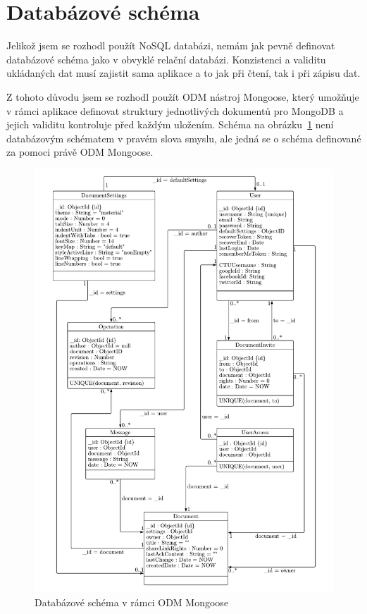 
\section{Databázové schéma}\label{sec:databázovéSchéma}

Jelikož jsem se rozhodl použít \gls{NoSQL} databázi, nemám jak pevně definovat databázové schéma jako v obvyklé relační databázi.
Konzistenci a validitu ukládaných dat musí zajistit sama aplikace a to jak při čtení, tak i při zápisu dat.

Z tohoto důvodu jsem se rozhodl použít \gls{ODM} nástroj Mongoose, který umožňuje v rámci aplikace definovat struktury jednotlivých dokumentů pro MongoDB a jejich validitu kontroluje před každým uložením.
Schéma na obrázku~\ref{fig:DB_model} není databázovým schématem v pravém slova smyslu, ale jedná se o schéma definované za pomoci právě \gls{ODM} Mongoose.

\begin{figure}[ht!]
    \centering
    \includegraphics[width=\textwidth]{partials/navrh/DB_model.pdf}
    \caption{Databázové schéma v rámci ODM Mongoose}\label{fig:DB_model}
\end{figure}

